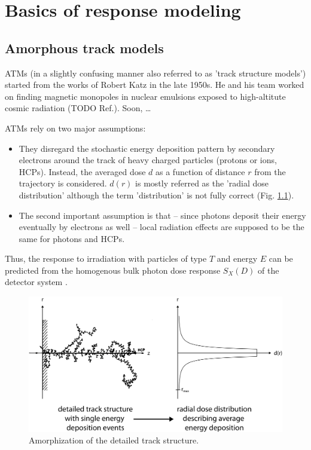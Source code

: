 \chapter{Basics of response modeling}

\section{Amorphous track models}
ATMs (in a slightly confusing manner also referred to as 'track structure
models') started from the works of Robert Katz in the late 1950s. He and his
team worked on finding magnetic monopoles in nuclear emulsions exposed to
high-altitute cosmic radiation (TODO Ref.). Soon, \ldots

ATMs rely on two major assumptions:

\begin{itemize}
\item{They disregard the stochastic energy deposition pattern by secondary
electrons around the track of heavy charged particles (protons or
ions, HCPs). Instead, the averaged dose $d$ as a function of
distance $r$ from the trajectory is considered. $d(r)$ is mostly referred as the
'radial dose distribution' although the term 'distribution' is not fully correct
(Fig. \ref{fig:TST}).}
\item{The second important assumption is that -- since photons deposit their
energy eventually by electrons as well -- local radiation effects are supposed
to be the same for photons and HCPs. }
\end{itemize}
Thus, the response to irradiation with particles of type $T$ and energy $E$ can
be predicted from the homogenous bulk photon dose response $S_X(D)$ of the
detector system \cite{Katz_et_al_1972, Waligorski_and_Katz_1980}.

\begin{figure}
	\centering
		\includegraphics[width=1.0\textwidth]{pictures/TrackStructureDetailAndRDD.png}
	\caption{Amorphization of the detailed track structure.}
	\label{fig:TST}
\end{figure}


